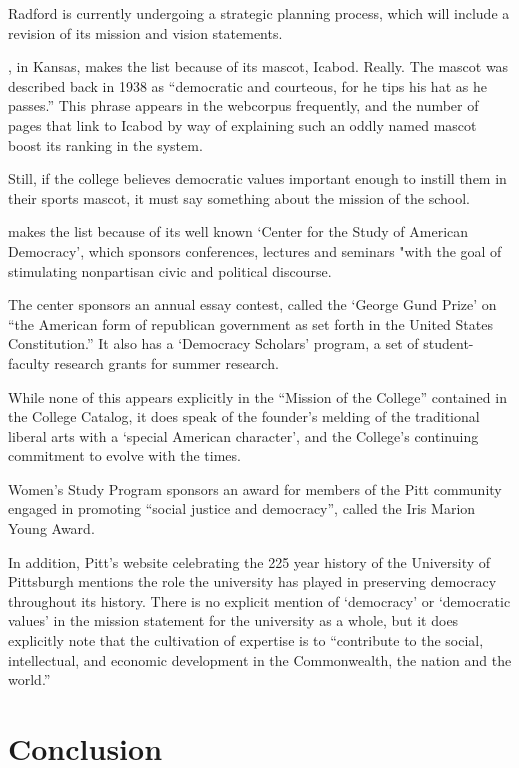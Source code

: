 Radford is currently undergoing a strategic planning process, which will include a revision of its mission and vision statements. 

, in Kansas, makes the list because of its mascot, Icabod. Really. The mascot was described back in 1938 as ``democratic and courteous, for he tips his hat as he passes.'' This phrase appears in the webcorpus frequently, and the number of pages that link to Icabod by way of explaining such an oddly named mascot boost its ranking in the system.

Still, if the college believes democratic values important enough to instill them in their sports mascot, it must say something about the mission of the school.

 makes the list because of its well known `Center for the Study of American Democracy', which sponsors conferences, lectures and seminars "with the goal of stimulating nonpartisan civic and political discourse.

The center sponsors an annual essay contest, called the `George Gund Prize' on ``the American form of republican government as set forth in the United States Constitution.'' It also has a `Democracy Scholars' program, a set of student-faculty research grants for summer research.

While none of this appears explicitly in the ``Mission of the College'' contained in the College Catalog, it does speak of the founder's melding of the traditional liberal arts with a `special American character', and the College's continuing commitment to evolve with the times. 

 Women's Study Program sponsors an award for members of the Pitt community engaged in promoting ``social justice and democracy'', called the Iris Marion Young Award. 

In addition, Pitt's website celebrating the 225 year history of the University of Pittsburgh mentions the role the university has played in preserving democracy throughout its history. There is no explicit mention of `democracy' or `democratic values' in the mission statement for the university as a whole, but it does explicitly note that the cultivation of expertise is to ``contribute to the social, intellectual, and economic development in the Commonwealth, the nation and the world.'' 

\section{Conclusion}
\label{conclusion}

